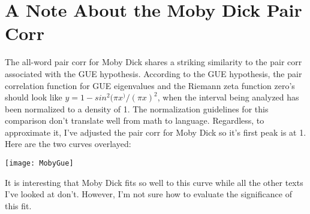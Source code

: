 \documentclass[11pt,letterpaper]{article}
\theoremstyle{definition}
\begin{document}
\section{A Note About the Moby Dick Pair Corr }

The all-word pair corr for Moby Dick shares a striking similarity to the pair corr associated with the GUE hypothesis. According to the GUE hypothesis, the pair correlation function for GUE eigenvalues and the Riemann zeta function zero's should look like $y = 1-sin^2(\pi x^)/(\pi x)^2$, when the interval being analyzed has been normalized to a density of 1. The normalization guidelines for this comparison don't translate well from math to language. Regardless, to approximate it, I've adjusted the pair corr for Moby Dick so it's first peak is at 1. Here are the two curves overlayed:

\texttt{[image: MobyGue]}

It is interesting that Moby Dick fits so well to this curve while all the other texts I've looked at don't. However, I'm not sure how to evaluate the significance of this fit.











% 
% 
\end{document}
